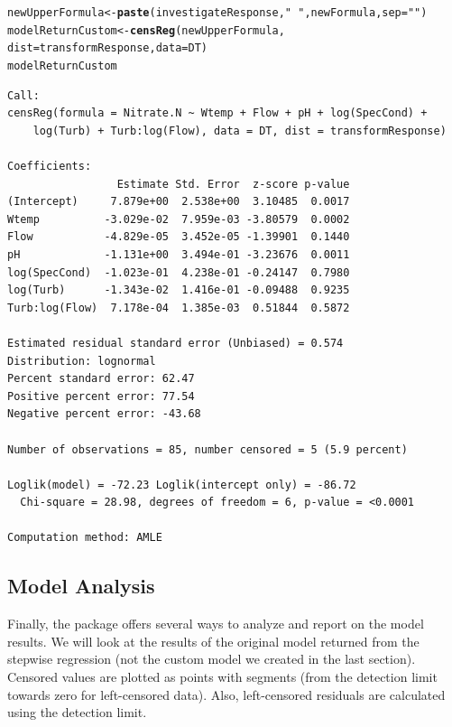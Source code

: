 \documentclass[a4paper,11pt]{article}\usepackage[]{graphicx}\usepackage[]{color}
\makeatletter
\newcommand{\hlstr}[1]{\textcolor[rgb]{0.192,0.494,0.8}{#1}}%
\newcommand{\hlstd}[1]{\textcolor[rgb]{0.345,0.345,0.345}{#1}}%
\newcommand{\hlkwb}[1]{\textcolor[rgb]{0.69,0.353,0.396}{#1}}%
\newcommand{\hlkwc}[1]{\textcolor[rgb]{0.333,0.667,0.333}{#1}}%
\newcommand{\hlkwd}[1]{\textcolor[rgb]{0.737,0.353,0.396}{\textbf{#1}}}%
\newenvironment{kframe}{%
 \def\at@end@of@kframe{}%
 \ifinner\ifhmode%
  \def\at@end@of@kframe{\end{minipage}}%
  \begin{minipage}{\columnwidth}%
 \fi\fi%
 \def\FrameCommand##1{\hskip\@totalleftmargin \hskip-\fboxsep
 \colorbox{shadecolor}{##1}\hskip-\fboxsep
     \hskip-\linewidth \hskip-\@totalleftmargin \hskip\columnwidth}%
 \MakeFramed {\advance\hsize-\width
   \@totalleftmargin\z@ \linewidth\hsize
   \@setminipage}}%
 {\par\unskip\endMakeFramed%
 \at@end@of@kframe}
\newenvironment{knitrout}{}{} %
\makeatother
\begin{document}
\begin{knitrout}
\color{fgcolor}\begin{kframe}
\begin{alltt}
\hlstd{newUpperFormula} \hlkwb{<-} \hlkwd{paste}\hlstd{(investigateResponse,}\hlstr{" ~ "}\hlstd{, newFormula,} \hlkwc{sep}\hlstd{=}\hlstr{""}\hlstd{)}
\hlstd{modelReturnCustom} \hlkwb{<-} \hlkwd{censReg}\hlstd{(newUpperFormula,}
                       \hlkwc{dist}\hlstd{=transformResponse,} \hlkwc{data}\hlstd{=DT)}
\hlstd{modelReturnCustom}
\end{alltt}
\begin{verbatim}
Call:
censReg(formula = Nitrate.N ~ Wtemp + Flow + pH + log(SpecCond) + 
    log(Turb) + Turb:log(Flow), data = DT, dist = transformResponse)

Coefficients:
                 Estimate Std. Error  z-score p-value
(Intercept)     7.879e+00  2.538e+00  3.10485  0.0017
Wtemp          -3.029e-02  7.959e-03 -3.80579  0.0002
Flow           -4.829e-05  3.452e-05 -1.39901  0.1440
pH             -1.131e+00  3.494e-01 -3.23676  0.0011
log(SpecCond)  -1.023e-01  4.238e-01 -0.24147  0.7980
log(Turb)      -1.343e-02  1.416e-01 -0.09488  0.9235
Turb:log(Flow)  7.178e-04  1.385e-03  0.51844  0.5872

Estimated residual standard error (Unbiased) = 0.574
Distribution: lognormal
Percent standard error: 62.47
Positive percent error: 77.54
Negative percent error: -43.68

Number of observations = 85, number censored = 5 (5.9 percent)

Loglik(model) = -72.23 Loglik(intercept only) = -86.72
  Chi-square = 28.98, degrees of freedom = 6, p-value = <0.0001

Computation method: AMLE
\end{verbatim}
\end{kframe}
\end{knitrout}

\subsection{Model Analysis}
Finally, the package offers several ways to analyze and report on the model results. We will look at the results of the original model returned from the stepwise regression (not the custom model we created in the last section). Censored values are plotted as points with segments (from the detection limit towards zero for left-censored data). Also, left-censored residuals are calculated using the detection limit.
\end{document}
